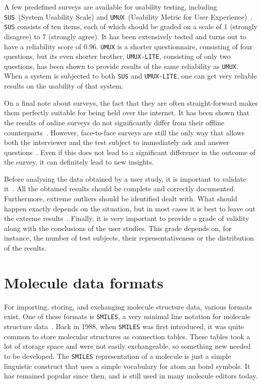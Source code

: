 A few predefined surveys are available for usability testing, including \verb|SUS|~(System Usability Scale) and \verb|UMUX|~(Usability Metric for User Experience)~\cite{lewis2013umux}. \verb|SUS| consists of ten items, each of which should be graded on a scale of 1 (strongly disagree) to 7 (strongly agree). It has been extensively tested and turns out to have a reliability score of 0.96. \verb|UMUX| is a shorter questionnaire, consisting of four questions, but its even shorter brother, \verb|UMUX-LITE|, consisting of only two questions, has been shown to provide results of the same reliability as \verb|UMUX|. When a system is subjected to both \verb|SUS| and \verb|UMUX-LITE|, one can get very reliable results on the usability of that system.

On a final note about surveys, the fact that they are often straight-forward makes them perfectly suitable for being held over the internet. It has been shown that the results of online surveys do not significantly differ from their offline counterparts~\cite{komarov2013crowdsourcing}. However, face-to-face surveys are still the only way that allows both the interviewer and the test subject to immediately ask and answer questions~\cite{wohlin2003empirical}. Even if this does not lead to a significant difference in the outcome of the survey, it can definitely lead to new insights.

Before analysing the data obtained by a user study, it is important to validate it~\cite{wohlin2003empirical}. All the obtained results should be complete and correctly documented. Furthermore, extreme outliers should be identified dealt with. What should happen exactly depends on the situation, but in most cases it is best to leave out the extreme results~\cite{komarov2013crowdsourcing}. Finally, it is very important to provide a grade of validity along with the conclusions of the user studies. This grade depends on, for instance, the number of test subjects, their representativeness or the distribution of the results.


\section{Molecule data formats}

For importing, storing, and exchanging molecule structure data, various formats exist. One of these formats is \verb|SMILES|, a very minimal line notation for molecule structure data~\cite{daylight1992daylight}. Back in 1988, when \verb|SMILES| was first introduced, it was quite common to store molecular structures as connection tables. These tables took a lot of storage space and were not easily exchangeable, so something new needed to be developed. The \verb|SMILES| representation of a molecule is just a simple linguistic construct that uses a simple vocabulary for atom an bond symbols. It has remained popular since then, and is still used in many molecule editors today.

